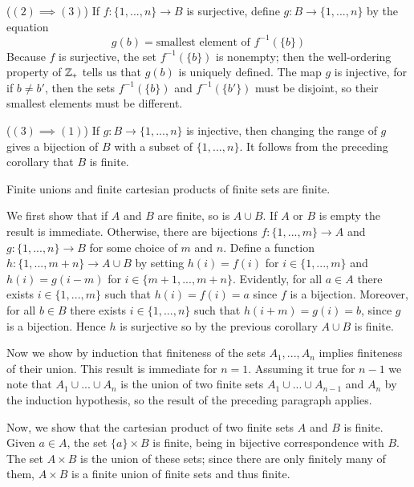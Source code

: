 \documentclass[12pt, a4paper, twoside, openright, titlepage]{book}
\begin{document}
\begin{appendices}
\begin{proof*}{}{}
        ($(2)\implies (3)$) If $f:\{1,...,n\}\rightarrow B$ is surjective, define $g:B\rightarrow \{1,...,n\}$ by the equation \begin{equation*}
            g(b) = \text{smallest element of } f^{-1}(\{b\})
        \end{equation*}
        Because $f$ is surjective, the set $f^{-1}(\{b\})$ is nonempty; then the well-ordering property of $\mathbb Z_+$ tells us that $g(b)$ is uniquely defined. The map $g$ is injective, for if $b \neq b'$, then the sets $f^{-1}(\{b\})$ and $f^{-1}(\{b'\})$ must be disjoint, so their smallest elements must be different.


        ($(3)\implies (1)$) If $g:B\rightarrow \{1,...,n\}$ is injective, then changing the range of $g$ gives a bijection of $B$ with a subset of $\{1,...,n\}$. It follows from the preceding corollary that $B$ is finite.
    \end{proof*}


    \begin{cor}{}{}
        Finite unions and finite cartesian products of finite sets are finite.
    \end{cor}
    \begin{proof*}{}{}
        We first show that if $A$ and $B$ are finite, so is $A\cup B$. If $A$ or $B$ is empty the result is immediate. Otherwise, there are bijections $f:\{1,...,m\}\rightarrow A$ and $g:\{1,...,n\}\rightarrow B$ for some choice of $m$ and $n$. Define a function $h:\{1,...,m+n\}\rightarrow A\cup B$ by setting $h(i) = f(i)$ for $i \in \{1,...,m\}$ and $h(i) = g(i-m)$ for $i \in \{m+1,...,m+n\}$. Evidently, for all $a \in A$ there exists $i \in \{1,...,m\}$ such that $h(i) = f(i) = a$ since $f$ is a bijection. Moreover, for all $b \in B$ there exists $i \in \{1,...,n\}$ such that $h(i+m) = g(i) = b$, since $g$ is a bijection. Hence $h$ is surjective so by the previous corollary $A\cup B$ is finite.

        Now we show by induction that finiteness of the sets $A_1,...,A_n$ implies finiteness of their union. This result is immediate for $n=1$. Assuming it true for $n-1$ we note that $A_1\cup...\cup A_n$ is the union of two finite sets $A_1\cup ... \cup A_{n-1}$ and $A_n$ by the induction hypothesis, so the result of the preceding paragraph applies.

        Now, we show that the cartesian product of two finite sets $A$ and $B$ is finite. Given $a \in A$, the set $\{a\}\times B$ is finite, being in bijective correspondence with $B$. The set $A \times B$ is the union of these sets; since there are only finitely many of them, $A\times B$ is a finite union of finite sets and thus finite.


\end{proof*}
\end{appendices}
\end{document}
